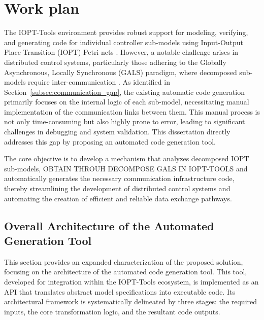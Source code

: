 
%

\chapter{Work plan}
\label{cha:work_plan}



 The IOPT-Tools environment provides robust support for modeling, verifying, and generating code for individual controller sub-models using Input-Output Place-Transition (IOPT) Petri nets \cite{iopttools, barros2004, RefiningIOPT}. However, a notable challenge arises in distributed control systems, particularly those adhering to the Globally Asynchronous, Locally Synchronous (GALS) paradigm, where decomposed sub-models require inter-communication \cite{galsactd, Barrosadd}. As identified in Section~\ref{subsec:communication_gap}, the existing automatic code generation primarily focuses on the internal logic of each sub-model, necessitating manual implementation of the communication links between them. This manual process is not only time-consuming but also highly prone to error, leading to significant challenges in debugging and system validation. This dissertation directly addresses this gap by proposing an automated code generation tool.
 
 The core objective is to develop a mechanism that analyzes decomposed IOPT sub-models, OBTAIN THROUH DECOMPOSE GALS IN IOPT-TOOLS and automatically generates the necessary communication infrastructure code, thereby streamlining the development of distributed control systems and automating the creation of efficient and reliable data exchange pathways.
 
 
\section{Overall Architecture of the Automated Generation Tool}
\label{sec:overall_architecture}

This section provides an expanded characterization of the proposed solution, focusing on the architecture of the automated code generation tool. This tool, developed for integration within the IOPT-Tools ecosystem, is implemented as an API that translates abstract model specifications into executable code. Its architectural framework is systematically delineated by three stages: the required inputs, the core transformation logic, and the resultant code outputs.


